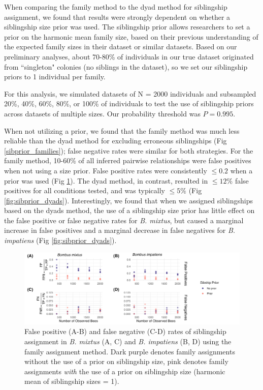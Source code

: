 \documentclass[12pt]{article}
\begin{document}
When comparing the family method to the dyad method for siblingship assignment, we found that results were strongly dependent on whether a siblingship size prior was used. The siblingship prior allows researchers to set a prior on the harmonic mean family size, based on their previous understanding of the expected family sizes in their dataset or similar datasets. Based on our preliminary analyses, about 70-80\% of individuals in our true dataset originated from ``singleton" colonies (no siblings in the dataset), so we set our siblingship priors to 1 individual per family.

For this analysis, we simulated datasets of N = 2000 individuals and subsampled 20\%, 40\%, 60\%, 80\%, or 100\% of individuals to test the use of siblingship priors across datasets of multiple sizes. Our probability threshold was $P = 0.995$. 

When not utilizing a prior, we found that the family method was much less reliable than the dyad method for excluding erroneous siblingships (Fig \ref{sibprior_families}); false negative rates were similar for both strategies. For the family method, 10-60\% of all inferred pairwise relationships were false positives when not using a size prior. False positive rates were consistently $\le 0.2$ when a prior was used (Fig \ref{fig:sibprior_families}). The dyad method, in contrast, resulted in $\le 12\%$ false positives for all conditions tested, and was typically $\le 5\%$ (Fig \ref{fig:sibprior_dyads}). Interestingly, we found that when we assigned siblingships based on the dyads method, the use of a siblingship size prior has little effect on the false positive or false negative rates for \emph{B. mixtus}, but caused a marginal increase in false positives and a marginal decrease in false negatives for \emph{B. impatiens} (Fig \ref{fig:sibprior_dyads}). 

\begin{figure}[H]
    \centering
    \includegraphics[width=\linewidth]{appendix_figures/sibprior_families.jpg}
    \caption{False positive (A-B) and false negative (C-D) rates of siblingship assignment in \emph{B. mixtus} (A, C) and \emph{B. impatiens} (B, D) using the family assignment method. Dark purple denotes family assignments without the use of a prior on siblingship size, pink denotes family assignments \emph{with} the use of a prior on siblingship size (harmonic mean of siblingship sizes = 1).}
    \label{fig:sibprior_families}
\end{figure}
\end{document}
